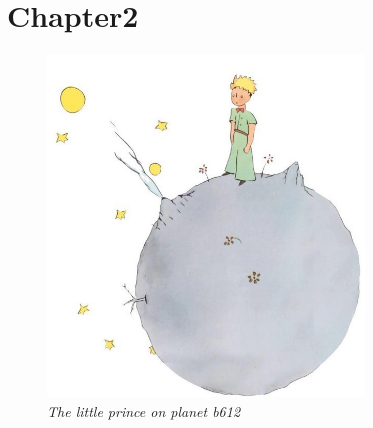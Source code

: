 \section{Chapter2}
		\label{sec:chapter2}

	\lipsum[1]

	\begin{figure} [H]
	 \centering
	  \includegraphics[width=0.75\textwidth]{02_body/chapter2/images/princeplanet.jpg}
		\caption[The little prince on planet b612]{\centering \textit{The little prince on planet b612}}
	  \label{fig:1}
	\end{figure}
\newpage
